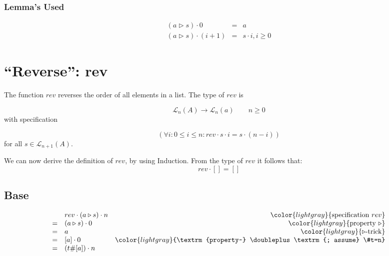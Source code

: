 \documentclass[onesided]{memoir}
\begin{document}
    
            \subsubsection{Lemma's Used}
            \begin{displaymath}
            \begin{array}{lcl}
                (a \triangleright s) \cdot 0 & = &  a \\
                (a\triangleright s)\cdot (i+1) & = & s\cdot i, i \geq 0
            \end{array}
            \end{displaymath}

    \section{``Reverse'': rev}\label{function:rev}
        The function $rev$ reverses the order of all elements in a list.
    The type of $rev$ is
    
    \begin{displaymath}
        \mathcal{L}_n(A) \rightarrow \mathcal{L}_n(a) \qquad n \geq 0
    \end{displaymath}
    with specification
    
    \begin{displaymath}
        (\forall i: 0 \leq i \leq n: rev\cdot s \cdot i = s\cdot (n-i))
    \end{displaymath}
    for all $s \in \mathcal{L}_{n+1}(A)$.
    
    We can now derive the definition of $rev$, by using Induction.
        From the type of $rev$ it follows that:
        \begin{displaymath}
            rev\cdot [] = []
        \end{displaymath}
        
        \subsection{Base}
        
        \begin{displaymath} \begin{array}{llr}
          & rev\cdot(a\triangleright s)\cdot n & \color{lightgray}{\textrm{specification~} rev} \\
        = & (a\triangleright s)\cdot 0  & \color{lightgray}{\textrm{property~} \triangleright}\\
        = & a & \color{lightgray}{\triangleright \textrm{-trick}}\\
        = & [a]\cdot 0 & \color{lightgray}{\textrm{property~} \doubleplus \textrm{; assume} \#t=n}\\
        = & (t \# [a])\cdot n & 
        \end{array} \end{displaymath}        
\end{document}
